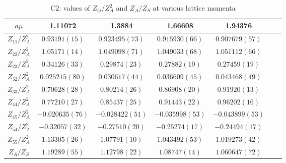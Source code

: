 \begin{table}
\begin{center}
\caption{\label{tab:C2renormvals}C2: values of $Z_{ij}/Z_A^2$ and $Z_A/Z_S$ at various lattice momenta}
\begin{tabular}{c|c c c c c c}
\hline
\hline
$a\mu$ & 1.11072 & 1.3884 & 1.66608 & 1.94376 \\
\hline
$Z_{11}/Z_A^2$ & $0.93191(15)$ & $0.923495(73)$ & $0.915930(66)$ & $0.907679(57)$ \\
\hline
$Z_{22}/Z_A^2$ & $1.05171(14)$ & $1.049098(71)$ & $1.049033(68)$ & $1.051112(66)$ \\
$Z_{23}/Z_A^2$ & $0.34126(33)$ & $0.29874(23)$ & $0.27882(19)$ & $0.27459(19)$ \\
$Z_{32}/Z_A^2$ & $0.025215(80)$ & $0.030617(44)$ & $0.036609(45)$ & $0.043468(49)$ \\
$Z_{33}/Z_A^2$ & $0.70628(28)$ & $0.80214(26)$ & $0.86908(20)$ & $0.91920(13)$ \\
\hline
$Z_{44}/Z_A^2$ & $0.77210(27)$ & $0.85437(25)$ & $0.91443(22)$ & $0.96202(16)$ \\
$Z_{45}/Z_A^2$ & $-0.020635(76)$ & $-0.028422(51)$ & $-0.035998(53)$ & $-0.043899(53)$ \\
$Z_{54}/Z_A^2$ & $-0.32057(32)$ & $-0.27510(20)$ & $-0.25274(17)$ & $-0.24494(17)$ \\
$Z_{55}/Z_A^2$ & $1.13305(26)$ & $1.07791(10)$ & $1.043492(53)$ & $1.019273(42)$ \\
\hline
$Z_A/Z_S$ & $1.19289(55)$ & $1.12798(22)$ & $1.08747(14)$ & $1.060647(72)$ \\
\hline
\hline
\end{tabular}
\end{center}
\end{table}